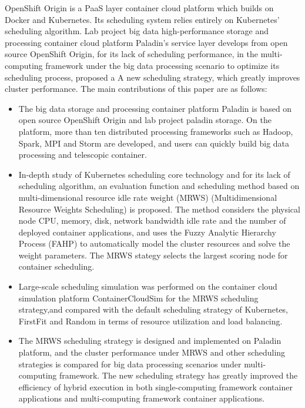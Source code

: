 \begin{eabstract}
OpenShift Origin is a PaaS layer container cloud platform which builds on Docker and Kubernetes. Its scheduling system relies entirely on Kubernetes' scheduling algorithm. Lab project big data high-performance storage and processing container cloud platform Paladin's service layer develops from open source OpenShift Origin, for its lack of scheduling performance, in the multi-computing framework under the big data processing scenario to optimize its scheduling process, proposed a A new scheduling strategy, which greatly improves cluster performance. The main contributions of this paper are as follows:
\begin{itemize}
	\item The big data storage and processing container platform Paladin is based on open source OpenShift Origin and lab project paladin storage. On the platform, more than ten distributed processing frameworks such as Hadoop, Spark, MPI and Storm are developed, and users can quickly build big data processing and telescopic container.
	\item In-depth study of Kubernetes scheduling core technology and for its lack of scheduling algorithm, an evaluation function and scheduling method based on multi-dimensional resource idle rate weight (MRWS) (Multidimensional Resource Weights Scheduling) is proposed. The method considers the physical node CPU, memory, disk, network bandwidth idle rate and the number of deployed container applications, and uses the Fuzzy Analytic Hierarchy Process (FAHP) to automatically model the cluster resources and solve the weight parameters. The MRWS stategy selects the largest scoring node for container scheduling.
	\item Large-scale scheduling simulation was performed on the container cloud simulation platform ContainerCloudSim for the MRWS scheduling strategy,and compared with the default scheduling strategy of Kubernetes, FirstFit and Random in terms of resource utilization and load balancing.
	\item The MRWS scheduling strategy is designed and implemented on Paladin platform, and the cluster performance under MRWS and other scheduling strategies is compared for big data processing scenarios under multi-computing framework. The new scheduling strategy has greatly improved the efficiency of hybrid execution in both single-computing framework container applications and multi-computing framework container applications.
\end{itemize}
  
\end{eabstract}












